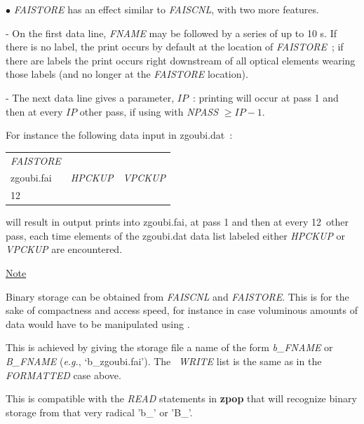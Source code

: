{\noindent $\bullet$  \textsl{FAISTORE} has an effect similar to \textsl{FAISCNL}, with two more features. 

- On the first data line, \textsl{FNAME} may be followed 
by a series of up to 10 \LABEL s.     If there is no 
label, the print occurs by default at the location of \textsl{FAISTORE}~; if there are labels the 
print occurs right downstream of all optical elements wearing those labels
 (and no longer at the \textsl{FAISTORE} location). 

- The next data line 
gives a parameter, $IP$~: printing will occur at pass 1 and then at every $IP$ other pass, if 
using \REBELOTE{} with \textsl{NPASS} $ \geq IP-1$. 

\medskip

\noindent For instance the following data input in zgoubi.dat~: 

\medskip

{\renewcommand{\arraystretch}{1}
\begin{tabular}{lll}
	\textsl{FAISTORE} &  &   \\
	zgoubi.fai \index{zgoubi.fai} & \textsl{HPCKUP} & \textsl{VPCKUP}  \\
	12 &  & 
\end{tabular}}
\medskip

\noindent will result in output prints into zgoubi.fai, at pass 1 and then at every 12~other 
pass, each time elements of the zgoubi.dat  data list labeled either \textsl{HPCKUP}
or \textsl{VPCKUP} are encountered.

\medskip

\noindent\underline{Note}
\medskip 

\noindent Binary storage can be obtained from \textsl{FAISCNL} and \textsl{FAISTORE}. This is for 
the sake of compactness and access speed, for instance  in case  voluminous amounts of 
data would have to be manipulated using \zpop. 

\medskip 
\noindent This is achieved by giving the storage file a name of the form \textsl{b\_FNAME} 
or \textsl{B\_FNAME}  (\emph{e.g.}, `b\_zgoubi.fai'). The \FORTRAN\ \textsl{WRITE} list 
is the same as in the \textsl{FORMATTED} case above.  

\medskip
\noindent This is compatible with the \textsl{READ} statements in \textbf{zpop} that will recognize binary storage 
from that very radical 'b\_' or 'B\_'. 



\newpage

}
